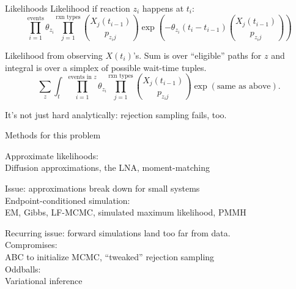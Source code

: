 \documentclass[12pt,a4paper,t,xcolor=dvipsnames,slidestop,compress,mathserif]{beamer}
\begin{document}
\begin{frame}{Likelihoods}
Likelihood if reaction $z_i$ happens at $t_i$: $$
\prod_{i=1}^\text{events} \theta_{z_{i}} \prod_{j=1}^\text{rxn types} {{X_{j}(t_{i-1})}\choose{p_{{z_{i}}j}}}\exp\left(-\theta_{z_{i}}
(t_i - t_{i-1}) {{X_j(t_{i-1})}\choose{p_{{z_{i}}j}}} \right)
$$
\pause

Likelihood from observing $X(t_i)$'s. Sum is over ``eligible'' paths for $z$ and integral is over a simplex of possible wait-time tuples.
$$
\sum_{z}\int_{t} \prod_{i=1}^\text{events in $z$} \theta_{z_{i}} \prod_{j=1}^\text{rxn types} {{X_{j}(t_{i-1})}\choose{p_{{z_{i}}j}}}\exp\left(\text{same as above}\right).
$$

It's not just hard analytically: rejection sampling fails, too.
\end{frame}

\begin{frame}{Methods for this problem}

Approximate likelihoods: \\ Diffusion approximations, the LNA, moment-matching\\
\phantom{0}

Issue: \pause approximations break down for small systems\\

Endpoint-conditioned simulation: \\ EM, Gibbs, LF-MCMC, simulated maximum likelihood, PMMH\\
\phantom{0}

Recurring issue: \pause forward simulations land too far from data.\\
\phantom{0}
Compromises: \\ABC to initialize MCMC, ``tweaked'' rejection sampling\\
\phantom{0}
Oddballs: \\ Variational inference
\end{frame}


\end{document}
